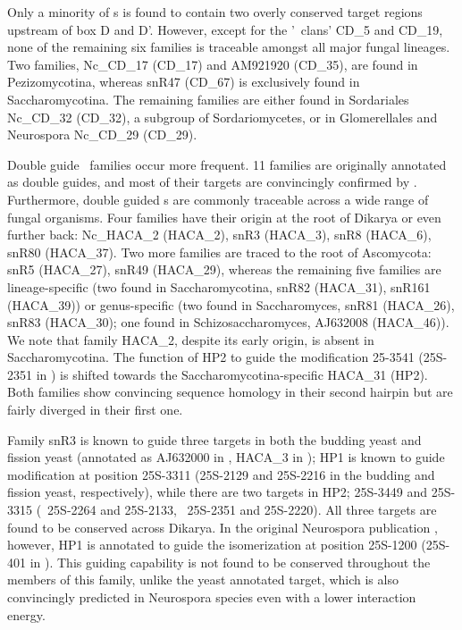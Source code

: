 Only a minority of \cd s is found to contain two overly conserved
target regions upstream of box D and D'. However, except for the '\sno\
clans' CD\_5 and CD\_19, none of the remaining six families is
traceable amongst all major fungal lineages. Two families, Nc\_CD\_17
(CD\_17) and AM921920 (CD\_35), are found in Pezizomycotina, whereas
snR47 (CD\_67) is exclusively found in Saccharomycotina. The remaining
families are either found in Sordariales Nc\_CD\_32 (CD\_32), a
subgroup of Sordariomycetes, or in Glomerellales and Neurospora
Nc\_CD\_29 (CD\_29).

Double guide \haca\ families occur more frequent. 11 families are
originally annotated as double guides, and most of their targets are
convincingly confirmed by \snostrip. Furthermore, double guided \haca s are
commonly traceable across a wide range of fungal organisms. Four families
have their origin at the root of Dikarya or even further back: Nc\_HACA\_2
(HACA\_2), snR3 (HACA\_3), snR8 (HACA\_6), snR80 (HACA\_37). Two more
families are traced to the root of Ascomycota: snR5 (HACA\_27), snR49
(HACA\_29), whereas the remaining five families are lineage-specific (two
found in Saccharomycotina, snR82 (HACA\_31), snR161 (HACA\_39)) or
genus-specific (two found in Saccharomyces, snR81 (HACA\_26), snR83
(HACA\_30); one found in Schizosaccharomyces, AJ632008
(HACA\_46)). We note that family HACA\_2, despite its early origin,
is absent in Saccharomycotina. The function of HP2 to guide the
modification 25-3541 (25S-2351 in \sce) is shifted towards the
Saccharomycotina-specific HACA\_31 (HP2). Both families show convincing
sequence homology in their second hairpin but are fairly diverged in their
first one.

Family snR3 is known \cite{Schattner:2004} to guide three targets in
both the budding yeast and fission yeast (annotated as AJ632000 in
\spo, HACA\_3 in \snostrip); HP1 is known to guide modification at
position 25S-3311 (25S-2129 and 25S-2216 in the budding and fission
yeast, respectively), while there are two targets in HP2; 25S-3449 and
25S-3315 (\sce\ 25S-2264 and 25S-2133, \spo\ 25S-2351 and
25S-2220). All three targets are found to be conserved across
Dikarya. In the original Neurospora publication \cite{Liu:2009},
however, HP1 is annotated to guide the isomerization at position
25S-1200 (25S-401 in \Ncr). This guiding capability is not found to be
conserved throughout the members of this family, unlike the yeast
annotated target, which is also convincingly predicted in Neurospora
species even with a lower interaction energy.


